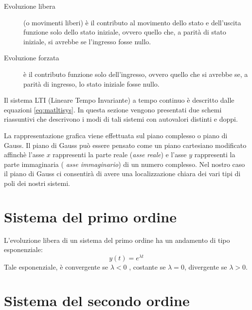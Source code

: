 \documentclass[a4paper]{report}
\begin{document}
\begin{description}
\item[Evoluzione libera] (o movimenti
liberi) \`e il contributo al movimento dello stato e dell'uscita
funzione solo dello stato iniziale, ovvero quello che, a parit\`a di
stato iniziale, si avrebbe se l'ingresso fosse nullo. 
\item[Evoluzione forzata] \`e il contributo
funzione solo dell'ingresso, ovvero quello che si avrebbe se, a parit\`a
di ingresso, lo stato iniziale fosse nullo. 
\end{description}
Il sistema LTI (Lineare Tempo Invariante) a tempo continuo \`e descritto
dalle equazioni \ref{eq:matltisys}. In questa sezione vengono
presentati due schemi riassuntivi che descrivono i modi di tali
sistemi con autovalori distinti e doppi.

La rappresentazione grafica viene effettuata sul piano
complesso o piano di Gauss. Il piano di Gauss pu\`o essere pensato come un piano
cartesiano modificato affinch\`e l'asse $x$ rappresenti la parte reale
({\em asse reale}) e l'asse $y$ rappresenti la parte immaginaria ({\em
asse immaginario}) di un numero complesso. Nel nostro caso il piano di
Gauss ci consentir\`a di avere una localizzazione chiara dei vari tipi
di poli dei nostri sistemi.

\section{Sistema del primo ordine}
L'evoluzione libera di un sistema del primo ordine ha un andamento di
tipo esponenziale: 
\[
y(t) = e^{\lambda t}
\]
Tale esponenziale, \`e convergente se $\lambda < 0$ , costante se
$\lambda = 0$, divergente se $\lambda > 0$.

\section{Sistema del secondo ordine}
\end{document}
